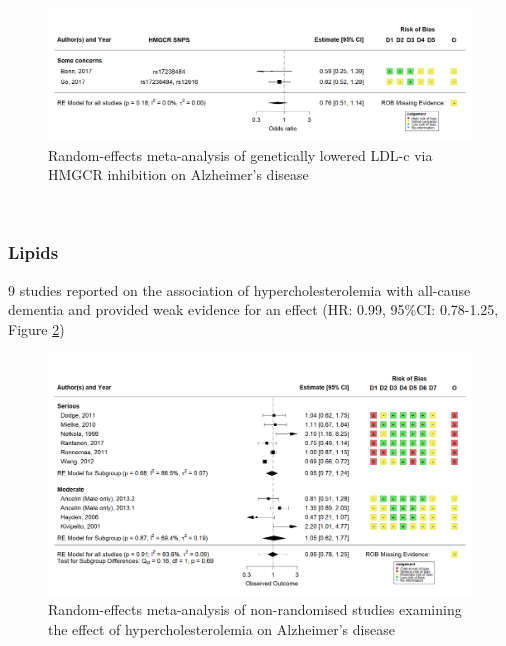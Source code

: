 \documentclass[a4paper, twoside]{templates/ociamthesis}
\begin{document}
\begin{figure}[H]
\includegraphics[width=1\linewidth]{figures/sys-rev/fp_MR_HMGCR_AD} \caption[Random-effects meta-analysis of genetically lowered LDL-c via HMGCR inhibition on Alzheimer's disease]{Random-effects meta-analysis of genetically lowered LDL-c via HMGCR inhibition on Alzheimer's disease}\label{fig:mrStatinADFig}
\end{figure}

~

\hypertarget{lipids-1}{%
\subsubsection{Lipids}\label{lipids-1}}

9 studies reported on the association of hypercholesterolemia with all-cause dementia and provided weak evidence for an effect (HR: 0.99, 95\%CI: 0.78-1.25, Figure \ref{fig:obsHyperAD})





\begin{figure}[H]
\includegraphics[width=1\linewidth]{figures/sys-rev/fp_obs_hyperchol_AD} \caption[Meta-analysis of hypercholesterolemia on Alzheimer's disease]{Random-effects meta-analysis of non-randomised studies examining the effect of hypercholesterolemia on Alzheimer's disease}\label{fig:obsHyperAD}
\end{figure}
\end{document}
